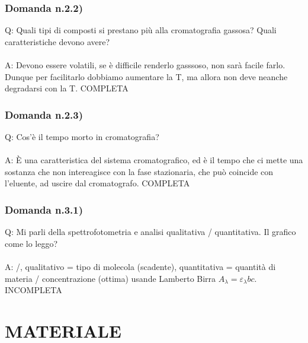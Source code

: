 \documentclass{article}
\begin{document}
\subsubsection{Domanda n.2.2)}
Q: Quali tipi di composti si prestano più alla cromatografia gassosa? Quali caratteristiche devono avere?
\\\\
A: Devono essere volatili, se è difficile renderlo gasssoso, non sarà facile farlo. Dunque per facilitarlo dobbiamo aumentare la T, ma allora non deve neanche degradarsi con la T. COMPLETA
\subsubsection{Domanda n.2.3)}
Q: Cos'è il tempo morto in cromatografia?
\\\\
A: È una caratteristica del sistema cromatografico, ed è il tempo che ci mette una sostanza che non intereagisce con la fase stazionaria, che può coincide con l'eluente, ad uscire dal cromatografo. COMPLETA
\subsubsection{Domanda n.3.1)}
Q: Mi parli della spettrofotometria e analisi qualitativa / quantitativa. Il grafico come lo leggo?
\\\\
A: /, qualitativo = tipo di molecola (scadente), quantitativa = quantità di materia / concentrazione (ottima) usande Lamberto Birra $A_{\lambda} = \varepsilon_{\lambda}bc$. INCOMPLETA 

\newpage

\section{MATERIALE}
\end{document}
